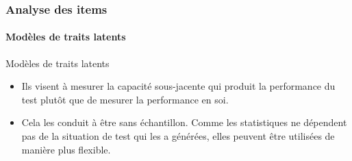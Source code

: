 \documentclass[aspectratio=169,professionalfonts, 12pt]{beamer}
\begin{document}

\begin{frame}
  \frametitle{Analyse des items}
  \framesubtitle{Modèles de traits latents}
  \justifying 
  \begin{minipage}{\textwidth}
  \begin{block}{Modèles de traits latents}
    \begin{itemize}
      \item	Ils visent à mesurer la capacité sous-jacente qui produit la performance du test plutôt que de mesurer la performance en soi.
      \item	Cela les conduit à être sans échantillon. Comme les statistiques ne dépendent pas de la situation de test qui les a générées, elles peuvent être utilisées de manière plus flexible.
    \end{itemize}
  \end{block}  
  \end{minipage} 
\end{frame}
\end{document}
